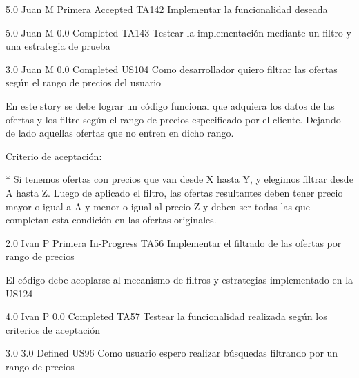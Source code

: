 	{} %
	{5.0} %
	{Juan M} %
	{Primera} %
	{Accepted} %
	\task
		{TA142} %
		{Implementar la funcionalidad deseada} %
		{

} %
		{5.0} %
		{Juan M} %
		{0.0} %
		{Completed} %
	\task
		{TA143} %
		{Testear la implementación mediante un filtro y una estrategia de prueba} %
		{

} %
		{3.0} %
		{Juan M} %
		{0.0} %
		{Completed} %
\userStory
	{US104} %
	{Como desarrollador quiero filtrar las ofertas según el rango de precios del usuario} %
	{En este story se debe lograr un código funcional que adquiera los datos de las
ofertas y los filtre según el rango de precios especificado por el cliente.
Dejando de lado aquellas ofertas que no entren en dicho rango.

  

Criterio de aceptación:

  

* Si tenemos ofertas con precios que van desde X hasta Y, y elegimos filtrar desde A hasta Z.  Luego de aplicado el filtro, las ofertas resultantes deben tener precio mayor o igual a A y menor o igual al precio Z y deben ser todas las que completan esta condición en las ofertas originales.

} %
	{} %
	{2.0} %
	{Ivan P} %
	{Primera} %
	{In-Progress} %
	\task
		{TA56} %
		{Implementar el filtrado de las ofertas por rango de precios} %
		{El código debe acoplarse al mecanismo de filtros y estrategias implementado en
la US124

} %
		{4.0} %
		{Ivan P} %
		{0.0} %
		{Completed} %
	\task
		{TA57} %
		{Testear la funcionalidad realizada según los criterios de aceptación} %
		{

} %
		{3.0} %
		{} %
		{3.0} %
		{Defined} %
\userStory
	{US96} %
	{Como usuario espero realizar búsquedas filtrando por un rango de precios} %

